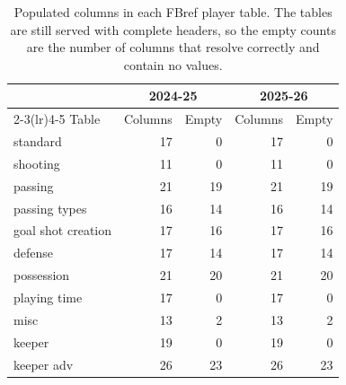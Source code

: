 \begin{table}[t]
\centering
\small
\caption{Populated columns in each FBref player table. The tables are still served with complete headers, so the empty counts are the number of columns that resolve correctly and contain no values.}
\label{tab:availability}
\begin{tabular}{lrrrr}
\toprule
 & \multicolumn{2}{c}{2024-25} & \multicolumn{2}{c}{2025-26} \\
\cmidrule(lr){2-3}\cmidrule(lr){4-5}
Table & Columns & Empty & Columns & Empty \\
\midrule
standard & 17 & 0 & 17 & 0 \\
shooting & 11 & 0 & 11 & 0 \\
passing & 21 & 19 & 21 & 19 \\
passing types & 16 & 14 & 16 & 14 \\
goal shot creation & 17 & 16 & 17 & 16 \\
defense & 17 & 14 & 17 & 14 \\
possession & 21 & 20 & 21 & 20 \\
playing time & 17 & 0 & 17 & 0 \\
misc & 13 & 2 & 13 & 2 \\
keeper & 19 & 0 & 19 & 0 \\
keeper adv & 26 & 23 & 26 & 23 \\
\bottomrule
\end{tabular}
\end{table}
